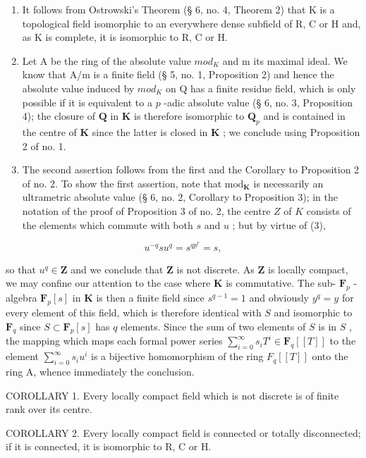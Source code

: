 \begin{enumerate}
\def\labelenumi{(\roman{enumi})}
\item
  It follows from Ostrowski's Theorem (§ 6, no. 4, Theorem 2) that K is a topological field isomorphic to an everywhere dense subfield of R, C or H and, as K is complete, it is isomorphic to R, C or H.
\item
  Let A be the ring of the absolute value \(mod_{K}\) and m its maximal ideal. We know that A/m is a finite field (§ 5, no. 1, Proposition 2) and hence the absolute value induced by \(mod_{K}\) on Q has a finite residue field, which is only possible if it is equivalent to a \(p\) -adic absolute value (§ 6, no. 3, Proposition 4); the closure of \(\mathbf{Q}\) in \(\mathbf{K}\) is therefore isomorphic to \(\mathbf{Q}_p\) and is contained in the centre of \(\mathbf{K}\) since the latter is closed in \(\mathbf{K}\) ; we conclude using Proposition 2 of no. 1.
\item
  The second assertion follows from the first and the Corollary to Proposition 2 of no. 2. To show the first assertion, note that \(\mathrm{mod}_{\mathbf{K}}\) is necessarily an ultrametric absolute value (§ 6, no. 2, Corollary to Proposition 3); in the notation of the proof of Proposition 3 of no. 2, the centre \(Z\) of \(K\) consists of the elements which commute with both \(s\) and \(u\) ; but by virtue of (3),
\end{enumerate}

\[
u ^ {- q} s u ^ {q} = s ^ {q p ^ {r}} = s,
\]

so that \(u^q \in \mathbf{Z}\) and we conclude that \(\mathbf{Z}\) is not discrete. As \(\mathbf{Z}\) is locally compact, we may confine our attention to the case where \(\mathbf{K}\) is commutative. The sub- \(\mathbf{F}_p\) -algebra \(\mathbf{F}_p[s]\) in \(\mathbf{K}\) is then a finite field since \(s^{q-1} = 1\) and obviously \(y^q = y\) for every element of this field, which is therefore identical with \(S\) and isomorphic to \(\mathbf{F}_q\) since \(S \subset \mathbf{F}_p[s]\) has \(q\) elements. Since the sum of two elements of \(S\) is in \(S\) , the mapping which maps each formal power series \(\sum_{i=0}^{\infty} s_i T^i \in \mathbf{F}_q[[T]]\) to the element \(\sum_{i=0}^{\infty}s_{i}u^{i}\) is a bijective homomorphism of the ring \(F_{q}[[T]]\) onto the ring A, whence immediately the conclusion.

COROLLARY 1. Every locally compact field which is not discrete is of finite rank over its centre.

COROLLARY 2. Every locally compact field is connected or totally disconnected; if it is connected, it is isomorphic to R, C or H.


